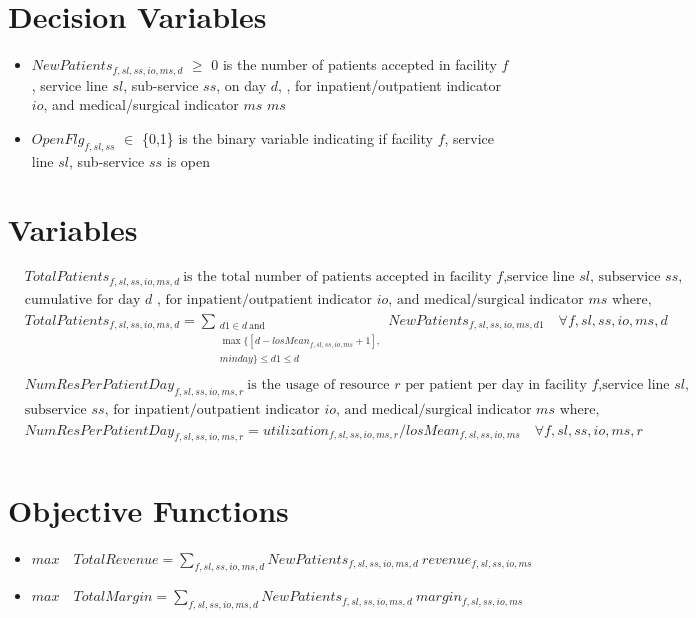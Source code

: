 \documentclass[10pt, letterpaper]{article}
\begin{document}
\section*{Decision Variables}
\begin{itemize}
\item [ ] $NewPatients_{f,sl,ss,io,ms,d}$ $\geq$ {0} is the number of patients accepted in facility $f$, service line $sl$, sub-service $ss$, on day $d$, , for inpatient/outpatient indicator $io$, and medical/surgical indicator $ms$ $ms$
\item [ ] $OpenFlg_{f,sl,ss}$ $\in$ \{0,1\} is the binary variable indicating if facility $f$, service line $sl$, sub-service $ss$ is open
\end{itemize}

\pagebreak

\section*{Variables}
\begin{align*}
&TotalPatients_{f,sl,ss,io,ms,d} \ \text{is the total number of patients accepted in facility $f$,service line $sl$, subservice $ss$,} \\
&\text{cumulative for day $d$ , for inpatient/outpatient indicator $io$, and medical/surgical indicator $ms$ where,} \\
&TotalPatients_{f,sl,ss,io,ms,d} =
\sum_{\substack{d1 \in d \ \text{and} \\
\max \{[d - losMean_{f,sl,ss,io,ms} + 1], \\ minday \} \leq d1 \leq d}}  NewPatients_{f,sl,ss,io,ms,d1} \quad \forall f,sl,ss,io,ms,d\ \\
\end{align*}
\begin{align*}
&NumResPerPatientDay_{f,sl,ss,io,ms,r} \ \text{is the usage of resource $r$ per patient per day in facility $f$,service line $sl$, } \\ 
&\text{subservice $ss$, for inpatient/outpatient indicator $io$, and medical/surgical indicator $ms$ where,} \\
&NumResPerPatientDay_{f,sl,ss,io,ms,r} = utilization_{f,sl,ss,io,ms,r} / losMean_{f,sl,ss,io,ms} \quad \forall f,sl,ss,io,ms,r\ \\
\end{align*}

\section*{Objective Functions}
\begin{itemize}
\item [ ] $max \quad TotalRevenue=\sum_{f,sl,ss,io,ms,d} NewPatients_{f,sl,ss,io,ms,d} \ revenue_{f,sl,ss,io,ms}$
\item [ ] $max \quad TotalMargin=\sum_{f,sl,ss,io,ms,d} NewPatients_{f,sl,ss,io,ms,d} \ margin_{f,sl,ss,io,ms}$
\end{itemize}
\end{document}
